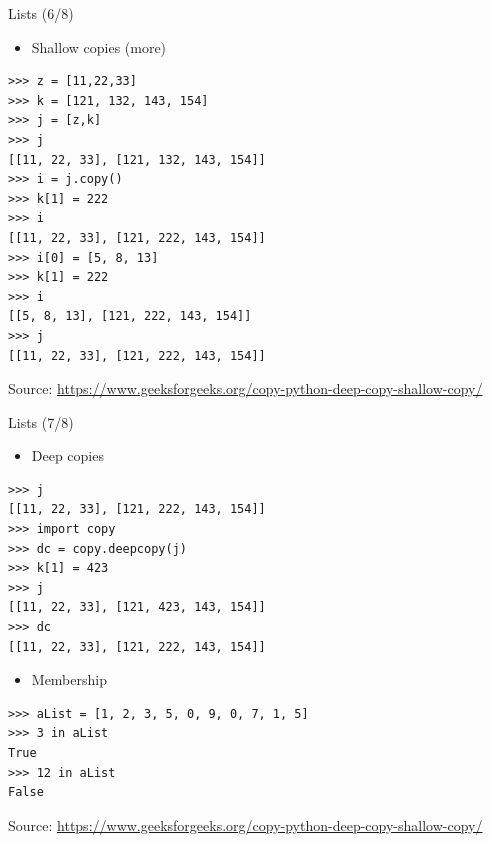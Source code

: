 \documentclass{beamer}
\begin{document}
\begin{frame}[fragile]
{\centerline{Lists (6/8)}}
\begin{itemize}
    \item Shallow copies (more)
\end{itemize} 
\begin{lstlisting}[style=myPythonStyle]
>>> z = [11,22,33]
>>> k = [121, 132, 143, 154]
>>> j = [z,k]
>>> j
[[11, 22, 33], [121, 132, 143, 154]]
>>> i = j.copy()
>>> k[1] = 222
>>> i
[[11, 22, 33], [121, 222, 143, 154]]
>>> i[0] = [5, 8, 13]
>>> k[1] = 222
>>> i
[[5, 8, 13], [121, 222, 143, 154]]
>>> j
[[11, 22, 33], [121, 222, 143, 154]]
\end{lstlisting}


\begin{center}
\tiny Source: \url{https://www.geeksforgeeks.org/copy-python-deep-copy-shallow-copy/}
\end{center}

\end{frame}





\begin{frame}[fragile]
{\centerline{Lists (7/8)}}
\begin{itemize}
    \item Deep copies
\end{itemize} 
\begin{lstlisting}[style=myPythonStyle]
>>> j
[[11, 22, 33], [121, 222, 143, 154]]
>>> import copy
>>> dc = copy.deepcopy(j)
>>> k[1] = 423
>>> j
[[11, 22, 33], [121, 423, 143, 154]]
>>> dc
[[11, 22, 33], [121, 222, 143, 154]]
\end{lstlisting}

\begin{itemize}
    \item Membership
\end{itemize} 

\begin{lstlisting}[style=myPythonStyle]
>>> aList = [1, 2, 3, 5, 0, 9, 0, 7, 1, 5]
>>> 3 in aList
True
>>> 12 in aList
False
\end{lstlisting}


\begin{center}
\tiny Source: \url{https://www.geeksforgeeks.org/copy-python-deep-copy-shallow-copy/}
\end{center}

\end{frame}
\end{document}
